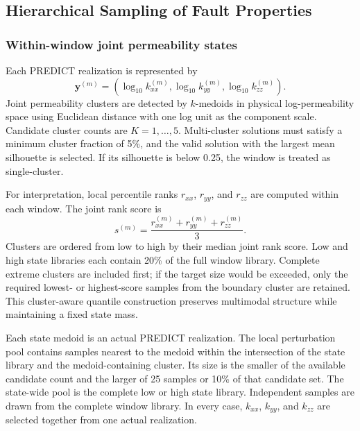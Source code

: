 
\subsection{Hierarchical Sampling of Fault Properties}

\subsubsection{Within-window joint permeability states}

Each PREDICT realization is represented by
\begin{equation}
\mathbf{y}^{(m)} = \left(\log_{10} k_{xx}^{(m)},
\log_{10} k_{yy}^{(m)},\log_{10} k_{zz}^{(m)}\right).
\end{equation}
Joint permeability clusters are detected by $k$-medoids in physical
log-permeability space using Euclidean distance with one log unit as the
component scale. Candidate cluster counts are $K=1,\ldots,5$. Multi-cluster
solutions must satisfy a minimum cluster fraction of 5\%, and the valid
solution with the largest mean silhouette is selected. If its silhouette is
below 0.25, the window is treated as single-cluster.

For interpretation, local percentile ranks $r_{xx}$, $r_{yy}$, and $r_{zz}$
are computed within each window. The joint rank score is
\begin{equation}
s^{(m)} = \frac{r_{xx}^{(m)}+r_{yy}^{(m)}+r_{zz}^{(m)}}{3}.
\end{equation}
Clusters are ordered from low to high by their median joint rank score. Low
and high state libraries each contain 20\% of the full window library.
Complete extreme clusters are included first; if the target size would be
exceeded, only the required lowest- or highest-score samples from the boundary
cluster are retained. This cluster-aware quantile construction preserves
multimodal structure while maintaining a fixed state mass.

Each state medoid is an actual PREDICT realization. The local perturbation
pool contains samples nearest to the medoid within the intersection of the
state library and the medoid-containing cluster. Its size is the smaller of
the available candidate count and the larger of 25 samples or 10\% of that
candidate set. The state-wide pool is the complete low or high state library.
Independent samples are drawn from the complete window library. In every
case, $k_{xx}$, $k_{yy}$, and $k_{zz}$ are selected together from one actual
realization.

